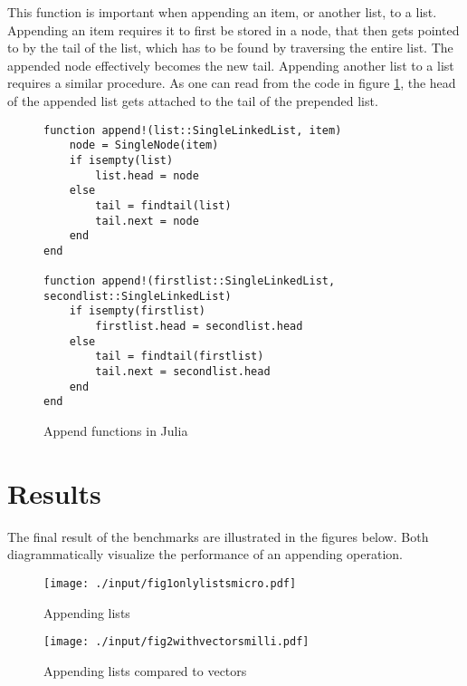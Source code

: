 \documentclass[a4paper, 11pt]{article}
\begin{document}
    This function is important when appending an item, or another list, to a list. 
    Appending an item requires it to first be stored in a node, that then gets pointed to 
    by the tail of the list, which has to be found by traversing the entire list. 
    The appended node effectively becomes the new tail. Appending another list to a list
    requires a similar procedure. As one can read from the code in 
    figure \ref{code:appendfunctions}, the head of the appended list gets attached to the tail 
    of the prepended list.
    
    \begin{figure}[H]
    \begin{verbatim}
function append!(list::SingleLinkedList, item)
    node = SingleNode(item)
    if isempty(list)
        list.head = node
    else
        tail = findtail(list) 
        tail.next = node
    end
end

function append!(firstlist::SingleLinkedList, secondlist::SingleLinkedList)
    if isempty(firstlist)
        firstlist.head = secondlist.head
    else
        tail = findtail(firstlist)
        tail.next = secondlist.head
    end
end
    \end{verbatim}
    \caption{Append functions in Julia}
    \label{code:appendfunctions}
    \end{figure}

    \clearpage

    \section*{Results}
    The final result of the benchmarks are illustrated in the figures below.
    Both diagrammatically visualize the performance of an appending operation. 
    
    \begin{figure}[h]
        \centering
        \texttt{[image: ./input/fig1onlylistsmicro.pdf]}
        \caption{Appending lists}
        \label{fig:appendlists}
    \end{figure}

    \begin{figure}[h]
        \centering
        \texttt{[image: ./input/fig2withvectorsmilli.pdf]}
        \caption{Appending lists compared to vectors}
        \label{fig:appendlistscomparedtovectors}
    \end{figure}
\end{document}
